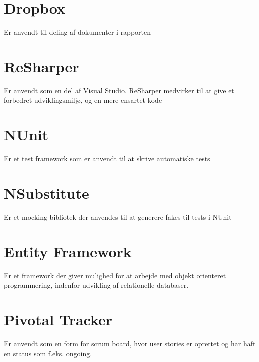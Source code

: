 \section*{Dropbox}
Er anvendt til deling af dokumenter i rapporten

\section*{ReSharper} %
Er anvendt som en del af Visual Studio. ReSharper medvirker til at give et forbedret udviklingsmiljø, og en mere ensartet kode 

\section*{NUnit}
Er et test framework som er anvendt til at skrive automatiske tests

\section*{NSubstitute}
Er et mocking bibliotek der anvendes til at generere fakes til tests i NUnit

\section*{Entity Framework}
Er et framework der giver mulighed for at arbejde med objekt orienteret programmering, indenfor udvikling af relationelle databaser. 

\section*{Pivotal Tracker}
Er anvendt som en form for scrum board, hvor user stories er oprettet og har haft en status som f.eks. ongoing. 
